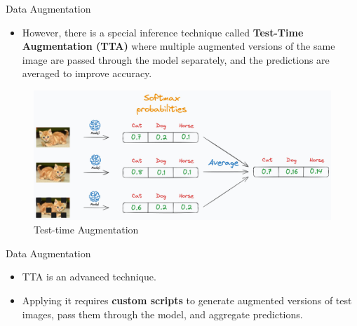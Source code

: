 \documentclass[10pt]{beamer}
\theoremstyle{remark}
\theoremstyle{definition}
\begin{document}
\begin{frame}{Data Augmentation}
\begin{itemize}

       \item However, there is a special inference technique called \textbf{Test-Time Augmentation (TTA)} where multiple augmented versions of the same image are passed through the model separately, and the predictions are averaged to improve accuracy.




\end{itemize}
\begin{figure}
    \centering
    \includegraphics[width=1.0\textwidth,height=1.0\textheight,keepaspectratio]{./images/tta.jpg}
    \caption{Test-time Augmentation}
    \end{figure}

\end{frame}

\begin{frame}{Data Augmentation}
\begin{itemize}

    \item TTA is an advanced technique.

    \item Applying it requires \textbf{custom scripts} to generate augmented versions of test images, pass them through the model, and aggregate predictions.


\end{itemize}
\end{frame}
\end{document}
